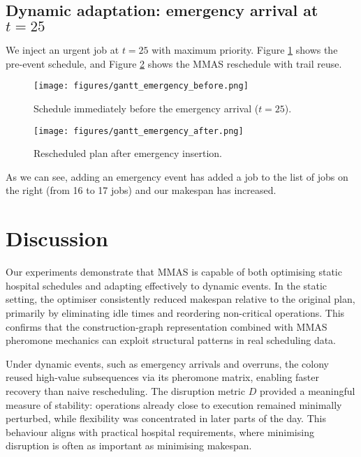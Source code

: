 \documentclass[final-report]{report-template}
\begin{document}
\subsection{Dynamic adaptation: emergency arrival at $t=25$}
We inject an urgent job at $t=25$ with maximum priority. Figure \ref{fig:gantt-emergency-before} shows the pre-event schedule, and Figure \ref{fig:gantt-emergency-after} shows the MMAS reschedule with trail reuse.

\begin{figure}[H]
  \centering
  \texttt{[image: figures/gantt\_emergency\_before.png]}
  \caption{Schedule immediately before the emergency arrival ($t=25$).}
  \label{fig:gantt-emergency-before}
\end{figure}

\begin{figure}[H]
  \centering
  \texttt{[image: figures/gantt\_emergency\_after.png]}
  \caption{Rescheduled plan after emergency insertion.}
  \label{fig:gantt-emergency-after}
\end{figure}


As we can see, adding an emergency event has added a job to the list of jobs on the right (from 16 to 17 jobs) and our makespan has increased.


\section{Discussion}

Our experiments demonstrate that MMAS is capable of both optimising static hospital schedules and adapting effectively to dynamic events. In the static setting, the optimiser consistently reduced makespan relative to the original plan, primarily by eliminating idle times and reordering non-critical operations. This confirms that the construction-graph representation combined with MMAS pheromone mechanics can exploit structural patterns in real scheduling data.

Under dynamic events, such as emergency arrivals and overruns, the colony reused high-value subsequences via its pheromone matrix, enabling faster recovery than naive rescheduling. The disruption metric $D$ provided a meaningful measure of stability: operations already close to execution remained minimally perturbed, while flexibility was concentrated in later parts of the day. This behaviour aligns with practical hospital requirements, where minimising disruption is often as important as minimising makespan.
\end{document}
